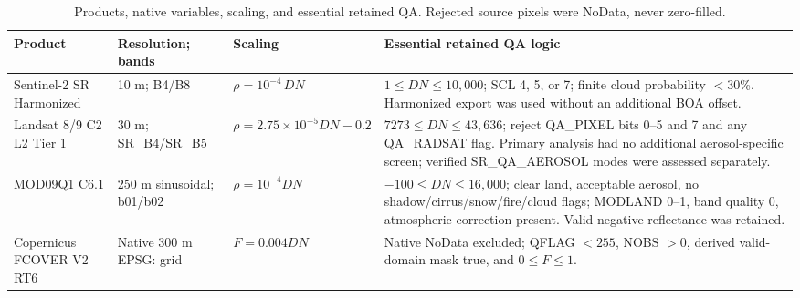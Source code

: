 \begin{table}[!t]\centering\footnotesize
\caption{Products, native variables, scaling, and essential retained QA. Rejected source pixels were NoData, never zero-filled.}\label{tab:data}
\begin{tabularx}{.98\textwidth}{L{3.20cm}L{2.05cm}L{2.40cm}Y}\toprule
Product & Resolution; bands & Scaling & Essential retained QA logic \\\midrule
Sentinel-2 SR Harmonized & 10 m; B4/B8 & $\rho=10^{-4}\,DN$ & $1\le DN\le10{,}000$; SCL 4, 5, or 7; finite cloud probability $<30$\%. Harmonized export was used without an additional BOA offset. \\
Landsat 8/9 C2 L2 Tier 1 & 30 m; SR\_B4/\allowbreak SR\_B5 & $\rho=2.75\times10^{-5}DN-0.2$ & $7273\le DN\le43{,}636$; reject QA\_PIXEL bits 0--5 and 7 and any QA\_RADSAT flag. Primary analysis had no additional aerosol-specific screen; verified SR\_QA\_AEROSOL modes were assessed separately. \\
MOD09Q1 C6.1 & 250 m sinusoidal; b01/b02 & $\rho=10^{-4}DN$ & $-100\le DN\le16{,}000$; clear land, acceptable aerosol, no shadow/cirrus/snow/fire/cloud flags; MODLAND 0--1, band quality 0, atmospheric correction present. Valid negative reflectance was retained. \\
Copernicus FCOVER V2 RT6 & Native 300 m EPSG: grid & $F=0.004DN$ & Native NoData excluded; QFLAG $<255$, NOBS $>0$, derived valid-domain mask true, and $0\le F\le1$. \\\bottomrule
\end{tabularx}
\end{table}
